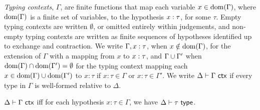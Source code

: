 
\emph{Typing contexts}, $\Gamma$, are finite functions that map each variable $x \in \text{dom}(\Gamma)$, where $\text{dom}(\Gamma)$ is a finite set of variables, to the hypothesis $x : \tau$, for some $\tau$. Empty typing contexts are written $\emptyset$, or omitted entirely within judgements, and non-empty typing contexts are written as finite sequences of hypotheses identified up to exchange and contraction. We write $\Gamma, x : \tau$, when $x \notin \text{dom}(\Gamma)$, for the extension of $\Gamma$ with a mapping from $x$ to $x : \tau$, and ${\Gamma}\cup{\Gamma'}$ when $\text{dom}(\Gamma) \cap \text{dom}(\Gamma') = \emptyset$ for the typing context mapping each $x \in \text{dom}(\Gamma) \cup \text{dom}(\Gamma')$ to $x : \tau$ if $x : \tau \in \Gamma$ or $x : \tau \in \Gamma'$. We write $\Delta \vdash \Gamma~\mathsf{ctx}$ if every type in $\Gamma$ is well-formed relative to $\Delta$.
\begin{definition} \label{def:isctxU}
$\Delta \vdash \Gamma~\mathsf{ctx}$ iff for each hypothesis $x : \tau \in \Gamma$, we have $\Delta \vdash \tau~\mathsf{type}$.
\end{definition}

